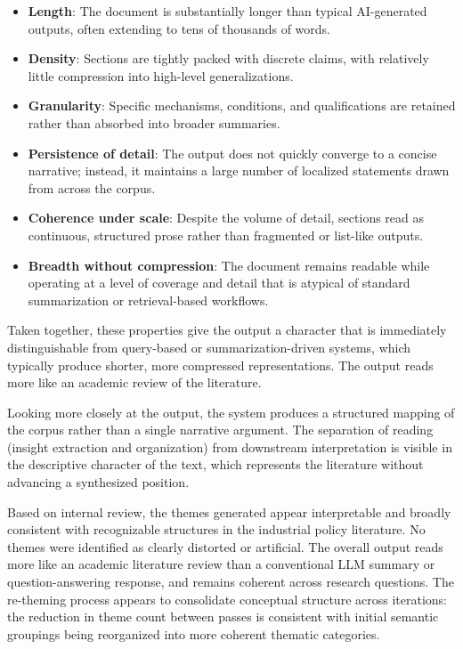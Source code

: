 \documentclass[
  11pt,
]{article}
\providecommand{\tightlist}{%
  \setlength{\itemsep}{0pt}\setlength{\parskip}{0pt}}
\begin{document}
\begin{itemize}
\tightlist
\item
  \textbf{Length}: The document is substantially longer than typical
  AI-generated outputs, often extending to tens of thousands of words.
\item
  \textbf{Density}: Sections are tightly packed with discrete claims,
  with relatively little compression into high-level generalizations.
\item
  \textbf{Granularity}: Specific mechanisms, conditions, and
  qualifications are retained rather than absorbed into broader
  summaries.
\item
  \textbf{Persistence of detail}: The output does not quickly converge
  to a concise narrative; instead, it maintains a large number of
  localized statements drawn from across the corpus.
\item
  \textbf{Coherence under scale}: Despite the volume of detail, sections
  read as continuous, structured prose rather than fragmented or
  list-like outputs.
\item
  \textbf{Breadth without compression}: The document remains readable
  while operating at a level of coverage and detail that is atypical of
  standard summarization or retrieval-based workflows.
\end{itemize}

Taken together, these properties give the output a character that is
immediately distinguishable from query-based or summarization-driven
systems, which typically produce shorter, more compressed
representations. The output reads more like an academic review of the
literature.

Looking more closely at the output, the system produces a structured
mapping of the corpus rather than a single narrative argument. The
separation of reading (insight extraction and organization) from
downstream interpretation is visible in the descriptive character of the
text, which represents the literature without advancing a synthesized
position.

Based on internal review, the themes generated appear interpretable 
and broadly consistent with recognizable structures in the industrial policy literature. 
No themes were identified as clearly distorted or
artificial. The overall output reads more like an academic literature review than 
a conventional LLM summary or question-answering response, 
and remains coherent across research questions. The re-theming process appears 
to consolidate conceptual structure across iterations: the reduction in theme count between passes
is consistent with initial semantic groupings being reorganized into
more coherent thematic categories.
\end{document}

